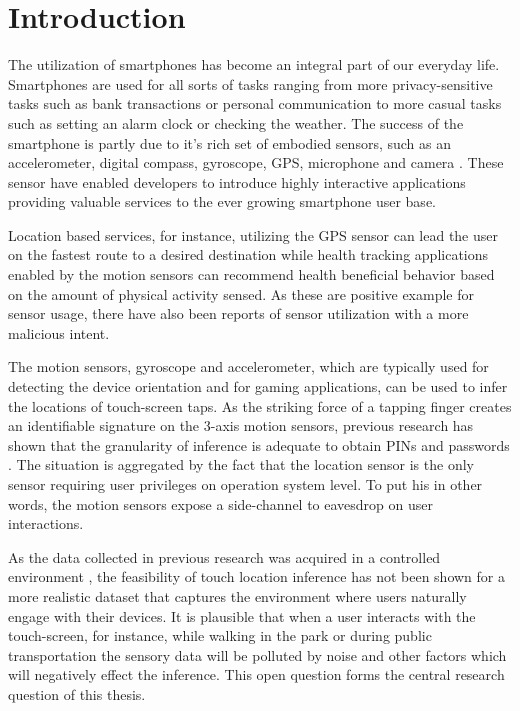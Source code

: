 \chapter{Introduction\label{cha:chapter1}}
The utilization of smartphones has become an integral part of our everyday life. Smartphones are used for all sorts of tasks ranging from more privacy-sensitive tasks such as bank transactions or personal communication to more casual tasks such as setting an alarm clock or checking the weather. The success of the smartphone is partly due to it's rich set of embodied sensors, such as an accelerometer, digital compass, gyroscope, GPS, microphone and camera \cite{5560598}. These sensor have enabled developers to introduce highly interactive applications providing valuable services to the ever growing smartphone user base.

Location based services, for instance, utilizing the GPS sensor\cite{link2011footpath} can lead the user on the fastest route to a desired destination while health tracking applications\cite{case2015accuracy} enabled by the motion sensors can recommend health beneficial behavior based on the amount of physical activity sensed. As these are positive example for sensor usage, there have also been reports of sensor utilization with a more malicious intent.

The motion sensors, gyroscope and accelerometer, which are typically used for detecting the device orientation and for gaming applications\cite{feijoo2012mobile}, can be used to infer the locations of touch-screen taps. As the striking force of a tapping finger creates an identifiable signature on the 3-axis motion sensors, previous research has shown that the granularity of inference is adequate to obtain PINs and passwords \cite{Touchlogger, Tapprints, Accessory}. The situation is aggregated by the fact that the location sensor is the only sensor requiring user privileges on operation system level. To put his in other words, the motion sensors expose a side-channel to eavesdrop on user interactions.

As the data collected in previous research was acquired in a controlled environment \cite{Tapprints, Touchlogger, Accessory}, the feasibility of touch location inference has not been shown for a more realistic dataset that captures the environment where users naturally engage with their devices. It is plausible that when a user interacts with the touch-screen, for instance, while walking in the park or during public transportation the sensory data will be polluted by noise and other factors which will negatively effect the inference. This open question forms the central research question of this thesis.

